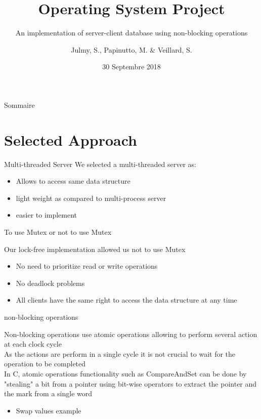 \documentclass{bredelebeamer}
\title[OS Project]{Operating System Project}
\subtitle{An implementation of server-client database using non-blocking operations}
\author{Julmy, S., Papinutto, M. \& Veillard, S.}
\institute[UniFr]{}
\date{30 Septembre 2018}
\begin{document}
    \begin{frame}
        \titlepage
    \end{frame}

    \begin{frame}{Sommaire}
        \tableofcontents
    \end{frame}

    \section{Selected Approach}

    \begin{frame}{Multi-threaded Server}
        We selected a multi-threaded server as: \\
        \begin{itemize}
            \item Allows to access same data structure
            \item light weight as compared to multi-process server
            \item easier to implement
        \end{itemize}
    \end{frame}

     \begin{frame}{To use Mutex or not to use Mutex}

         Our lock-free implementation allowed us not to use Mutex \\

        \begin{itemize}
            \item No need to prioritize read or write operations
            \item No deadlock problems
            \item All clients have the same right to access the data structure at any time
        \end{itemize}
    \end{frame}

     \begin{frame}{non-blocking operations}

        Non-blocking operations use atomic operations allowing to perform several action at each clock cycle\\
        As the actions are perform in a single cycle it is not crucial to wait for the operation to be completed \\
        In C, atomic operations functionality such as CompareAndSet can be done by "stealing" a bit from a pointer
        using bit-wise operators to extract the pointer and the mark from a single word \\

        \begin{itemize}
            \item Swap values example
        \end{itemize}
    \end{frame}
\end{document}
